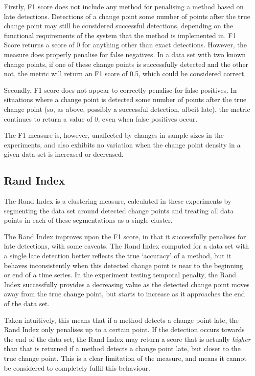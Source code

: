 \documentclass[../main.tex]{subfiles}
\begin{document}
Firstly, F1 score does not include any method for penalising a method based on late detections. Detections of a change point some number of points after the true change point may still be considered successful detections, depending on the functional requirements of the system that the method is implemented in. F1 Score returns a score of 0 for anything other than exact detections. However, the measure does properly penalise for false negatives. In a data set with two known change points, if one of these change points is successfully detected and the other not, the metric will return an F1 score of 0.5, which could be considered correct.

Secondly, F1 score does not appear to correctly penalise for false positives. In situations where a change point is detected some number of points after the true change point (so, as above, possibly a successful detection, albeit late), the metric continues to return a value of 0, even when false positives occur.

The F1 measure is, however, unaffected by changes in sample sizes in the experiments, and also exhibits no variation when the change point density in a given data set is increased or decreased.

\subsection{Rand Index}

The Rand Index is a clustering measure, calculated in these experiments by segmenting the data set around detected change points and treating all data points in each of these segmentations as a single cluster.

The Rand Index improves upon the F1 score, in that it successfully penalises for late detections, with some caveats. The Rand Index computed for a data set with a single late detection better reflects the true `accuracy' of a method, but it behaves inconsistently when this detected change point is near to the beginning or end of a time series. In the experiment testing temporal penalty, the Rand Index successfully provides a decreasing value as the detected change point moves away from the true change point, but starts to increase as it approaches the end of the data set.

Taken intuitively, this means that if a method detects a change point late, the Rand Index only penalises up to a certain point. If the detection occurs towards the end of the data set, the Rand Index may return a score that is actually \emph{higher} than that is returned if a method detects a change point late, but closer to the true change point. This is a clear limitation of the measure, and means it cannot be considered to completely fulfil this behaviour.
\end{document}
